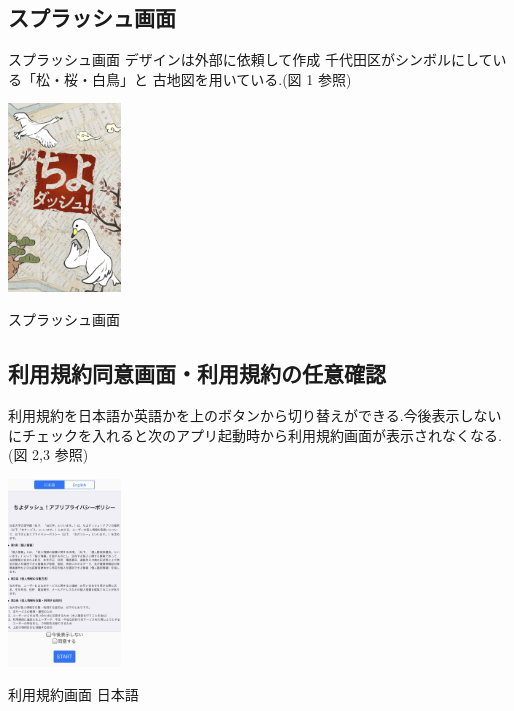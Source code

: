 \documentclass[a4paper, twoside]{jarticle}
\makeatletter
\newenvironment{figurehere}
  {\def\@captype{figure}}
  {}
\makeatother
\begin{document}
\begin{multicols}{2}
\subsection{スプラッシュ画面}
スプラッシュ画面
デザインは外部に依頼して作成
千代田区がシンボルにしている「松・桜・白鳥」と
古地図を用いている.(図 1 参照)
\begin{figurehere}
\begin{center}
\includegraphics[bb=30 50 550 1300,width=3cm]{./image01.jpg}%
\end{center}
\caption{スプラッシュ画面}\label{fig:1}
\end{figurehere}

\subsection{利用規約同意画面・利用規約の任意確認}
利用規約を日本語か英語かを上のボタンから切り替えができる.今後表示しないにチェックを入れると次のアプリ起動時から利用規約画面が表示されなくなる.(図 2,3 参照)
\begin{figurehere}
\begin{center}
\includegraphics[bb=30 50 550 1300,width=3cm]{./image02.jpg}%
\end{center}
\caption{利用規約画面 日本語}\label{fig:2}


\end{figurehere}
\end{multicols}
\end{document}
